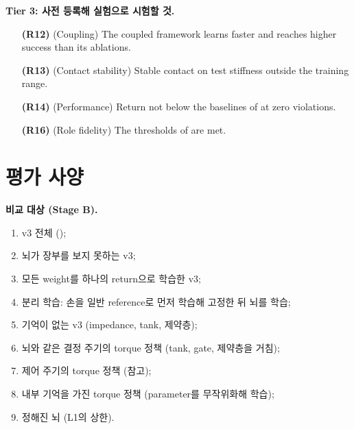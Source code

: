 \documentclass[11pt]{article}\usepackage[margin=1in]{geometry}\usepackage{amsmath,amssymb,amsthm,mathtools}\usepackage{graphicx}\graphicspath{{figures/}{../figures/}{figs/}{./}}\usepackage{enumitem}\usepackage{hyperref}\usepackage{cleveref}\usepackage{tikz}\usetikzlibrary{arrows.meta,positioning,calc,shapes.geometric}\usepackage{float}\usepackage{rotating}\usepackage[most]{tcolorbox}\usepackage{kotex}\usepackage{booktabs}\usepackage{longtable}\emergencystretch=1.6em\tolerance=2000 \crefname{assumption}{Assumption}{Assumptions}\Crefname{assumption}{Assumption}{Assumptions}\crefname{definition}{Definition}{Definitions}\Crefname{definition}{Definition}{Definitions}\crefname{proposition}{Proposition}{Propositions}\Crefname{proposition}{Proposition}{Propositions}\crefname{fact}{Fact}{Facts}\Crefname{fact}{Fact}{Facts} \newtheorem{assumption}{Assumption}\newtheorem{definition}{Definition}\newtheorem{lemma}{Lemma}\newtheorem{proposition}{Proposition}\newtheorem{theorem}{Theorem}\newtheorem{corollary}{Corollary}\newtheorem{fact}{Fact}\theoremstyle{remark}\newtheorem{remark}{Remark} \newcommand{\R}{\mathbb{R}}\newcommand{\xb}{\bar x}\newcommand{\Ab}{\bar A}\newcommand{\By}{\bar B_y}\newcommand{\U}{\mathcal U}\newcommand{\Z}{\mathcal Z}
\begin{document}
\textbf{Tier 3: 사전 등록해 실험으로 시험할 것.}
\begin{itemize}
\item[\textbf{(R12)}] (Coupling) The coupled framework learns faster and reaches higher success than its ablations.
\item[\textbf{(R13)}] (Contact stability) Stable contact on test stiffness outside the training range.
\item[\textbf{(R14)}] (Performance) Return not below the baselines of  at zero violations.
\item[\textbf{(R16)}] (Role fidelity) The thresholds of  are met.
\end{itemize}

\section{평가 사양}
\label{sec:eval}

\textbf{비교 대상 (Stage B).}
\begin{enumerate}[label=(\arabic*)]
\item v3 전체 ();
\item 뇌가 장부를 보지 못하는 v3;
\item 모든 weight를 하나의 return으로 학습한 v3;
\item 분리 학습: 손을 일반 reference로 먼저 학습해 고정한 뒤 뇌를 학습;
\item 기억이 없는 v3 (impedance, tank, 제약층);
\item 뇌와 같은 결정 주기의 torque 정책 (tank, gate, 제약층을 거침);
\item 제어 주기의 torque 정책 (참고);
\item 내부 기억을 가진 torque 정책 (parameter를 무작위화해 학습);
\item 정해진 뇌 (L1의 상한).
\end{enumerate}
\end{document}
